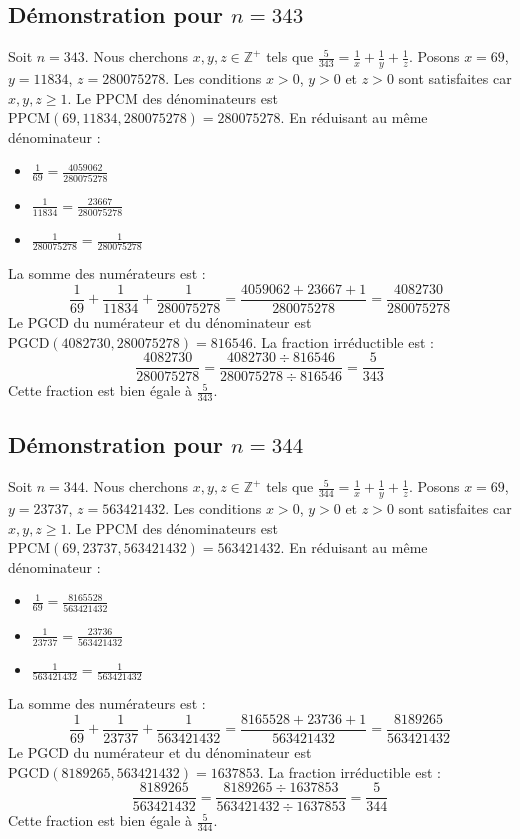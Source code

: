 \documentclass[11pt,a4paper]{article}
\begin{document}
\subsection{Démonstration pour $n = 343$}
Soit $n = 343$. Nous cherchons $x, y, z \in \mathbb{Z}^{+}$ tels que $\frac{5}{343} = \frac{1}{x} + \frac{1}{y} + \frac{1}{z}$.
Posons $x = 69$, $y = 11834$, $z = 280075278$.
Les conditions $x > 0$, $y > 0$ et $z > 0$ sont satisfaites car $x, y, z \geq 1$.
Le PPCM des dénominateurs est $\text{PPCM}(69, 11834, 280075278) = 280075278$.
En réduisant au même dénominateur :
\begin{itemize}
    \item $\frac{1}{69} = \frac{4059062}{280075278}$
    \item $\frac{1}{11834} = \frac{23667}{280075278}$
    \item $\frac{1}{280075278} = \frac{1}{280075278}$
\end{itemize}
La somme des numérateurs est :
$$ \frac{1}{69} + \frac{1}{11834} + \frac{1}{280075278} = \frac{4059062 + 23667 + 1}{280075278} = \frac{4082730}{280075278} $$
Le PGCD du numérateur et du dénominateur est $\text{PGCD}(4082730, 280075278) = 816546$.
La fraction irréductible est :
$$ \frac{4082730}{280075278} = \frac{4082730 \div 816546}{280075278 \div 816546} = \frac{5}{343} $$
Cette fraction est bien égale à $\frac{5}{343}$.

\subsection{Démonstration pour $n = 344$}
Soit $n = 344$. Nous cherchons $x, y, z \in \mathbb{Z}^{+}$ tels que $\frac{5}{344} = \frac{1}{x} + \frac{1}{y} + \frac{1}{z}$.
Posons $x = 69$, $y = 23737$, $z = 563421432$.
Les conditions $x > 0$, $y > 0$ et $z > 0$ sont satisfaites car $x, y, z \geq 1$.
Le PPCM des dénominateurs est $\text{PPCM}(69, 23737, 563421432) = 563421432$.
En réduisant au même dénominateur :
\begin{itemize}
    \item $\frac{1}{69} = \frac{8165528}{563421432}$
    \item $\frac{1}{23737} = \frac{23736}{563421432}$
    \item $\frac{1}{563421432} = \frac{1}{563421432}$
\end{itemize}
La somme des numérateurs est :
$$ \frac{1}{69} + \frac{1}{23737} + \frac{1}{563421432} = \frac{8165528 + 23736 + 1}{563421432} = \frac{8189265}{563421432} $$
Le PGCD du numérateur et du dénominateur est $\text{PGCD}(8189265, 563421432) = 1637853$.
La fraction irréductible est :
$$ \frac{8189265}{563421432} = \frac{8189265 \div 1637853}{563421432 \div 1637853} = \frac{5}{344} $$
Cette fraction est bien égale à $\frac{5}{344}$.
\end{document}
